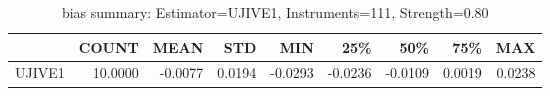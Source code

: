 \begin{table}[ht]
\centering
\caption{bias summary: Estimator=UJIVE1, Instruments=111, Strength=0.80}
\begin{tabular}{lrrrrrrrr}
\toprule
 & COUNT & MEAN & STD & MIN & 25\% & 50\% & 75\% & MAX \\
\midrule
UJIVE1 & 10.0000 & -0.0077 & 0.0194 & -0.0293 & -0.0236 & -0.0109 & 0.0019 & 0.0238 \\
\bottomrule
\end{tabular}
\end{table}
